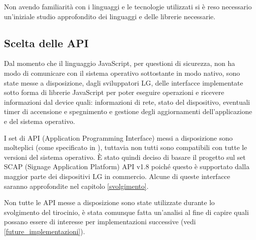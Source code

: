 Non avendo familiarità con i linguaggi e le tecnologie utilizzati si è reso necessario un'iniziale studio approfondito dei linguaggi e delle librerie necessarie.

\subsection{Scelta delle API} \label{api}

Dal momento che il linguaggio JavaScript, per questioni di sicurezza, non ha modo di comunicare con il sistema operativo sottostante in modo nativo, sono state messe a disposizione, dagli sviluppatori LG, delle interfacce implementate sotto forma di librerie JavaScript per poter eseguire operazioni e ricevere informazioni dal device quali: informazioni di rete, stato del dispositivo, eventuali timer di accensione e spegnimento e gestione degli aggiornamenti dell'applicazione e del sistema operativo.

I set di API (Application Programming Interface) messi a disposizione sono molteplici (come specificato in \cite{LgDoc}), tuttavia non tutti sono compatibili con tutte le versioni del sistema operativo. È stato quindi deciso di basare il progetto sul set SCAP (Signage Application Platform) API v1.8 poiché questo è supportato dalla maggior parte dei dispositivi LG in commercio. Alcune di queste interfacce saranno approfondite nel capitolo \ref*{svolgimento}.

Non tutte le API messe a disposizione sono state utilizzate durante lo svolgimento del tirocinio, è stata comunque fatta un'analisi al fine di capire quali possano essere di interesse per implementazioni successive (vedi \ref*{future_implementazioni}).